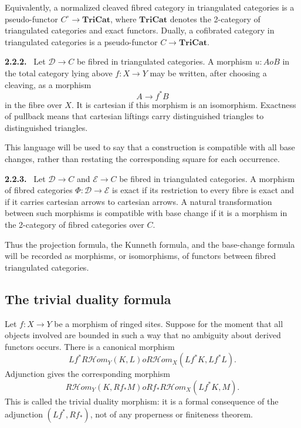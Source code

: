 \documentclass[12pt]{article}
\newenvironment{statement}[1]{\par\medskip\noindent\textbf{#1.}\ }{\par\medskip}
\begin{document}
Equivalently, a normalized cleaved fibred category in triangulated categories is a pseudo-functor \(C^{\circ}\to\mathbf{TriCat}\), where \(\mathbf{TriCat}\) denotes the 2-category of triangulated categories and exact functors. Dually, a cofibrated category in triangulated categories is a pseudo-functor \(C\to\mathbf{TriCat}\).

\begin{statement}{2.2.2}
Let \(\mathcal D\to C\) be fibred in triangulated categories. A morphism \(u:A	o B\) in the total category lying above \(f:X\to Y\) may be written, after choosing a cleaving, as a morphism
\[
A\longrightarrow f^*B
\]
in the fibre over \(X\). It is cartesian if this morphism is an isomorphism. Exactness of pullback means that cartesian liftings carry distinguished triangles to distinguished triangles.
\end{statement}

This language will be used to say that a construction is compatible with all base changes, rather than restating the corresponding square for each occurrence.

\begin{statement}{2.2.3}
Let \(\mathcal D\to C\) and \(\mathcal E\to C\) be fibred in triangulated categories. A morphism of fibred categories \(\Phi:\mathcal D\to\mathcal E\) is exact if its restriction to every fibre is exact and if it carries cartesian arrows to cartesian arrows. A natural transformation between such morphisms is compatible with base change if it is a morphism in the 2-category of fibred categories over \(C\).
\end{statement}

Thus the projection formula, the Kunneth formula, and the base-change formula will be recorded as morphisms, or isomorphisms, of functors between fibred triangulated categories.

\subsection{The trivial duality formula}

Let \(f:X\to Y\) be a morphism of ringed sites. Suppose for the moment that all objects involved are bounded in such a way that no ambiguity about derived functors occurs. There is a canonical morphism
\[
Lf^*R\mathcal Hom_Y(K,L)	o R\mathcal Hom_X(Lf^*K,Lf^*L).
\]
Adjunction gives the corresponding morphism
\[
R\mathcal Hom_Y(K,Rf_*M)	o Rf_*R\mathcal Hom_X(Lf^*K,M).
\]
This is called the trivial duality morphism: it is a formal consequence of the adjunction \((Lf^*,Rf_*)\), not of any properness or finiteness theorem.
\end{document}
